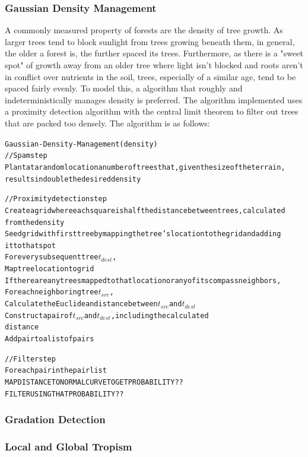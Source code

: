 \documentclass{article}
\newcommand{\tab}{\hspace*{2em}}
\begin{document}
            \subsubsection{Gaussian Density Management}
    \tab A commonly measured property of forests are the density of tree growth. As larger trees
tend to block sunlight from trees growing beneath them, in general, the older a forest is, the
further spaced its trees. Furthermore, as there is a "sweet spot" of growth away from an older tree
where light isn't blocked and roots aren't in conflict over nutrients in the soil, trees,
especially of a similar age, tend to be spaced fairly evenly. To model this, a algorithm that
roughly and indeterministically manages density is preferred. The algorithm implemented uses a
proximity detection algorithm\cite{kramii14} with the central limit theorem to filter out trees
that are packed too densely. The algorithm is as follows:
    \begin{alltt}
Gaussian-Density-Management(density)
    // Spam step
    Plant at a random location a number of trees that, given the size of the terrain,
        results in double the desired density

    // Proximity detection step
    Create a grid where each square is half the distance between trees, calculated
        from the density
    Seed grid with first tree by mapping the tree's location to the grid and adding
        it to that spot
    For every subsequent tree \(t_{dest}\),
        Map tree location to grid
        If there are any trees mapped to that location or any of its compass neighbors,
            For each neighboring tree \(t_{src}\),
                Calculate the Euclidean distance between \(t_{src}\) and \(t_{dest}\)
                Construct a pair of \(t_{src}\) and \(t_{dest}\), including the calculated
                    distance
                Add pair to a list of pairs

    // Filter step
    For each pair in the pair list
        MAP DISTANCE TO NORMAL CURVE TO GET PROBABILITY??
        FILTER USING THAT PROBABILITY??
    \end{alltt}

            \subsubsection{Gradation Detection}
            \subsubsection{Local and Global Tropism}
\end{document}
